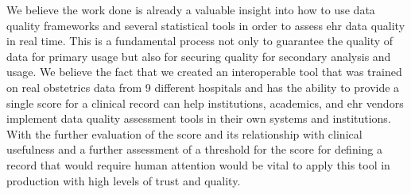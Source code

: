 
We believe the work done is already a valuable insight into how to use data quality frameworks and several statistical tools in order to assess \ac{ehr} data quality in real time. This is a fundamental process not only to guarantee the quality of data for primary usage but also for securing quality for secondary analysis and usage. We believe the fact that we created an interoperable tool that was trained on real obstetrics data from 9 different hospitals and has the ability to provide a single score for a clinical record can help institutions, academics, and \ac{ehr} vendors implement data quality assessment tools in their own systems and institutions. With the further evaluation of the score and its relationship with clinical usefulness and a further assessment of a threshold for the score for defining a record that would require human attention would be vital to apply this tool in production with high levels of trust and quality.
